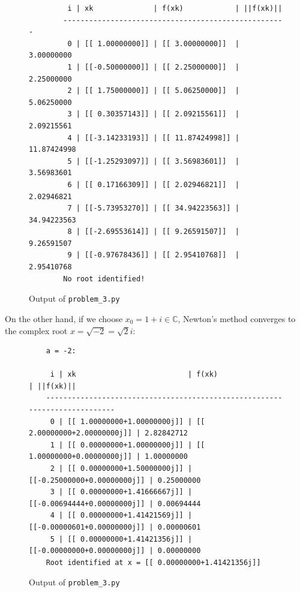 \begin{solution}
\begin{figure}[h]
\begin{verbatim}
         i | xk              | f(xk)            | ||f(xk)||    
        ----------------------------------------------------
         0 | [[ 1.00000000]] | [[ 3.00000000]]  | 3.00000000
         1 | [[-0.50000000]] | [[ 2.25000000]]  | 2.25000000
         2 | [[ 1.75000000]] | [[ 5.06250000]]  | 5.06250000
         3 | [[ 0.30357143]] | [[ 2.09215561]]  | 2.09215561
         4 | [[-3.14233193]] | [[ 11.87424998]] | 11.87424998
         5 | [[-1.25293097]] | [[ 3.56983601]]  | 3.56983601
         6 | [[ 0.17166309]] | [[ 2.02946821]]  | 2.02946821
         7 | [[-5.73953270]] | [[ 34.94223563]] | 34.94223563
         8 | [[-2.69553614]] | [[ 9.26591507]]  | 9.26591507
         9 | [[-0.97678436]] | [[ 2.95410768]]  | 2.95410768
        No root identified!
    \end{verbatim}
    \normalsize
    \caption{Output of \texttt{problem\_3.py}}
  \end{figure}

  On the other hand, if we choose $x_0 = 1 + i \in \mathbb{C}$, Newton's method converges to the complex root 
  $x = \sqrt{-2} = \sqrt{2}i$:

  \begin{figure}[h]
    \small
    \begin{verbatim}
    a = -2:
    
     i | xk                          | f(xk)                       | ||f(xk)||    
    ---------------------------------------------------------------------------
     0 | [[ 1.00000000+1.00000000j]] | [[ 2.00000000+2.00000000j]] | 2.82842712
     1 | [[ 0.00000000+1.00000000j]] | [[ 1.00000000+0.00000000j]] | 1.00000000
     2 | [[ 0.00000000+1.50000000j]] | [[-0.25000000+0.00000000j]] | 0.25000000
     3 | [[ 0.00000000+1.41666667j]] | [[-0.00694444+0.00000000j]] | 0.00694444
     4 | [[ 0.00000000+1.41421569j]] | [[-0.00000601+0.00000000j]] | 0.00000601
     5 | [[ 0.00000000+1.41421356j]] | [[-0.00000000+0.00000000j]] | 0.00000000
    Root identified at x = [[ 0.00000000+1.41421356j]]
    \end{verbatim}
    \normalsize
    \caption{Output of \texttt{problem\_3.py}}
  \end{figure}

  \ \\
\end{solution}